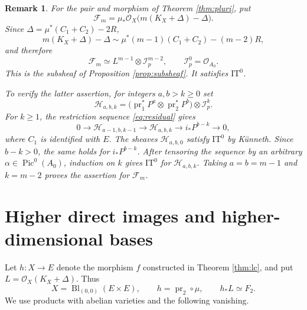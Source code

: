 \documentclass[10pt,a4paper]{amsart}
\newtheorem{remark}[theorem]{Remark}
\newcommand{\OO}{\mathcal O}
\newcommand{\FF}{\mathcal F}
\newcommand{\II}{\mathcal I}
\DeclareMathOperator{\Pic}{Pic}
\DeclareMathOperator{\pr}{pr}
\DeclareMathOperator{\Bl}{Bl}
\begin{document}
\begin{remark}\label{rem:plurisubsheaf}
For the pair and morphism of Theorem \ref{thm:pluri}, put
\[
\FF_m=\mu_*\OO_X\bigl(m(K_X+\Delta)-\Delta\bigr).
\]
Since $\Delta=\mu^*(C_1+C_2)-2R$,
\[
m(K_X+\Delta)-\Delta\sim\mu^*(m-1)(C_1+C_2)-(m-2)R,
\]
and therefore
\[
\FF_m\simeq L^{m-1}\otimes\II_p^{m-2},\qquad \II_p^0=\OO_{A_0}.
\]
This is the subsheaf of Proposition \ref{prop:subsheaf}. It satisfies $\mathrm{IT}^0$.

To verify the latter assertion, for integers $a,b>k\ge0$ set
\[
\mathcal H_{a,b,k}=\bigl(\pr_1^*P^a\otimes\pr_2^*P^b\bigr)\otimes\II_p^k.
\]
For $k\ge1$, the restriction sequence \eqref{eq:residual} gives
\[
0\longrightarrow\mathcal H_{a-1,b,k-1}\longrightarrow\mathcal H_{a,b,k}
\longrightarrow i_*P^{b-k}\longrightarrow0,
\]
where $C_1$ is identified with $E$. The sheaves $\mathcal H_{a,b,0}$ satisfy $\mathrm{IT}^0$ by K\"unneth. Since $b-k>0$, the same holds for $i_*P^{b-k}$. After tensoring the sequence by an arbitrary $\alpha\in\Pic^0(A_0)$, induction on $k$ gives $\mathrm{IT}^0$ for $\mathcal H_{a,b,k}$. Taking $a=b=m-1$ and $k=m-2$ proves the assertion for $\FF_m$.
\end{remark}

\section{Higher direct images and higher-dimensional bases}
Let $h:X\to E$ denote the morphism $f$ constructed in Theorem \ref{thm:lc}, and put $L=\OO_X(K_X+\Delta)$. Thus
\[
X=\Bl_{(0,0)}(E\times E),\qquad h=\pr_2\circ\mu,\qquad h_*L\simeq F_2.
\]
We use products with abelian varieties and the following vanishing.
\end{document}

